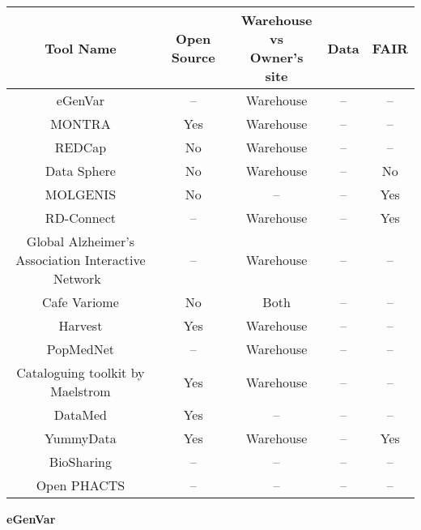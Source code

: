 \begin{tabular}{ | c | c | c | c | c | }
\hline 
Tool Name & Open Source & \makecell{Warehouse \\ vs \\ Owner's site}  & Data & FAIR\\
\hline
eGenVar \cite{egenvar} & -- & Warehouse & -- & -- \\
\hline
MONTRA \cite{montra} & Yes & Warehouse & -- & -- \\
\hline
REDCap \cite{redcap} & No & Warehouse & -- & -- \\
\hline
Data Sphere \cite{datasphere} & No & Warehouse & -- & No \\
\hline
MOLGENIS \cite{molgenis} & No & -- & -- & Yes \\
\hline
RD-Connect \cite{rdconnect} & -- & Warehouse & -- & Yes \\
\hline
\makecell{Global Alzheimer's \\Association Interactive\\ Network}~\cite{gaain} & -- & Warehouse & -- & -- \\
\hline
Cafe Variome \cite{cafevariome} & No & Both & -- & -- \\
\hline
Harvest \cite{harvest} & Yes & Warehouse & -- & -- \\
\hline
PopMedNet \cite{popmednet} & -- & Warehouse & -- & -- \\
\hline
Cataloguing toolkit by Maelstrom \cite{maelstrom} & Yes & Warehouse & -- & -- \\
\hline
DataMed \cite{datamed} & Yes & -- & -- & -- \\
\hline
YummyData \cite{yummydata} & Yes & Warehouse & -- & Yes \\
\hline
BioSharing \cite{biosharing} & -- & -- & -- & -- \\
\hline
Open PHACTS \cite{phacts} & -- & -- & -- & -- \\
\hline
\end{tabular}

\textbf{eGenVar}


